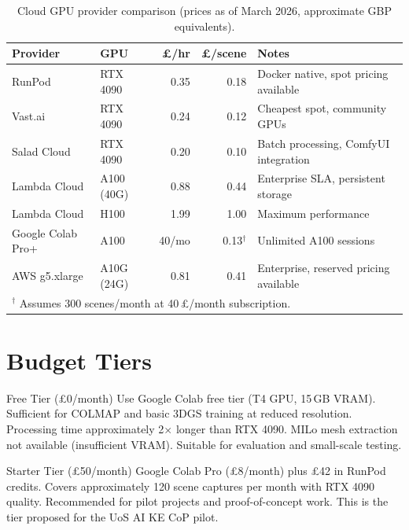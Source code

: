\begin{table}[htbp]
\centering
\caption{Cloud GPU provider comparison (prices as of March 2026, approximate GBP equivalents).}
\label{tab:cloud-pricing}
\small
\begin{tabular}{@{}llrrp{4.5cm}@{}}
\toprule
\textbf{Provider} & \textbf{GPU} & \textbf{\pounds/hr} & \textbf{\pounds/scene} & \textbf{Notes} \\
\midrule
RunPod        & RTX 4090    & 0.35 & 0.18 & Docker native, spot pricing available \\
Vast.ai       & RTX 4090    & 0.24 & 0.12 & Cheapest spot, community GPUs \\
Salad Cloud   & RTX 4090    & 0.20 & 0.10 & Batch processing, ComfyUI integration \\
Lambda Cloud  & A100 (40G)  & 0.88 & 0.44 & Enterprise SLA, persistent storage \\
Lambda Cloud  & H100        & 1.99 & 1.00 & Maximum performance \\
Google Colab Pro+ & A100   & 40/mo & 0.13$^\dagger$ & Unlimited A100 sessions \\
AWS g5.xlarge & A10G (24G)  & 0.81 & 0.41 & Enterprise, reserved pricing available \\
\bottomrule
\multicolumn{5}{l}{\footnotesize $^\dagger$ Assumes 300 scenes/month at 40\,\pounds/month subscription.}
\end{tabular}
\end{table}

\section{Budget Tiers}
\label{sec:budget-tiers}

\begin{recommendation}{Free Tier (\pounds0/month)}
Use Google Colab free tier (T4 GPU, 15\,GB VRAM). Sufficient for COLMAP and basic 3DGS training at reduced resolution. Processing time approximately 2$\times$ longer than RTX 4090. MILo mesh extraction not available (insufficient VRAM). Suitable for evaluation and small-scale testing.
\end{recommendation}

\begin{recommendation}{Starter Tier (\pounds50/month)}
Google Colab Pro (\pounds8/month) plus \pounds42 in RunPod credits. Covers approximately 120 scene captures per month with RTX 4090 quality. Recommended for pilot projects and proof-of-concept work. This is the tier proposed for the UoS AI KE CoP pilot.
\end{recommendation}

